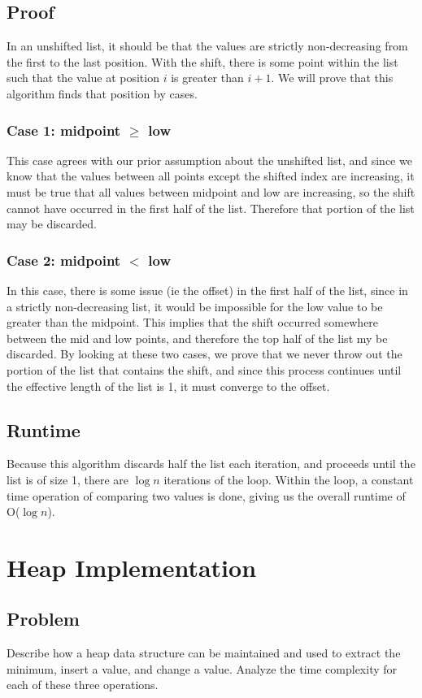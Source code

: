\documentclass[titlepage]{article}
\numberwithin{equation}{subsection}
\begin{document}
\subsection{Proof}
In an unshifted list, it should be that the values are strictly non-decreasing from the first to the last
position. With the shift, there is some point within the list such that the value at position $i$ 
is greater than $i+1$. We will prove that this algorithm finds that position by cases.
\subsubsection{Case 1: midpoint $\geq$ low}
This case agrees with our prior assumption about the unshifted list, and since we know that the values between
all points except the shifted index are increasing, it must be true that all values between midpoint and low
are increasing, so the shift cannot have occurred in the first half of the list. Therefore that portion of the
list may be discarded.
\subsubsection{Case 2: midpoint $<$ low}
In this case, there is some issue (ie the offset) in the first half of the list, since in a strictly non-decreasing
list, it would be impossible for the low value to be greater than the midpoint. This implies that the shift
occurred somewhere between the mid and low points, and therefore the top half of the list my be discarded.
By looking at these two cases, we prove that we never throw out the portion of the list that contains
the shift, and since this process continues until the effective length of the list is 1, it must converge
to the offset.
\subsection{Runtime}
Because this algorithm discards half the list each iteration, and proceeds until the list is of size 1, there
are $\log n$ iterations of the loop. Within the loop, a constant time operation of comparing two values is done,
giving us the overall runtime of O($\log n$).
\section{Heap Implementation}
\subsection{Problem}
Describe how a heap data structure can be maintained and used to extract the minimum, insert a value,
and change a value. Analyze the time complexity for each of these three operations.
\end{document}
